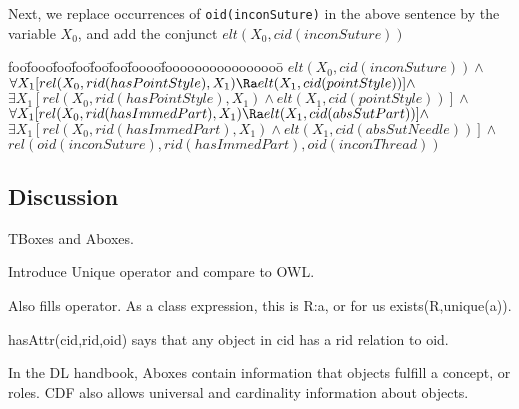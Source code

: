 \noindent
Next, we replace occurrences of {\tt oid(inconSuture)} in the above
sentence by the variable $X_0$, and add the conjunct
$elt(X_0,cid(inconSuture))$ 
{\small
\begin{tabbing}
foo\=fooo\=foo\=foo\=foo\=foo\=foooo\=foooooooooooooooo\=\kill
\> $elt(X_0,cid(inconSuture)) \wedge$ \\
\> $\forall X_1 [rel(X_0,rid(hasPointStyle),X_1) 
	\Ra elt(X_1,cid(pointStyle))] \wedge$ \\
\> $\exists X_1 [rel(X_0,rid(hasPointStyle),X_1) 
	\wedge elt(X_1,cid(pointStyle))] \wedge$ \\
\> $\forall X_1 [rel(X_0,rid(hasImmedPart),X_1) 
	\Ra elt(X_1,cid(absSutPart))] \wedge$ \\
\> $\exists X_1 [rel(X_0,rid(hasImmedPart),X_1) 
	\wedge elt(X_1,cid(absSutNeedle))] \wedge$ \\
\> $rel(oid(inconSuture),rid(hasImmedPart),oid(inconThread))$ 
\end{tabbing}
}



\subsection{Discussion}

TBoxes and Aboxes.

Introduce Unique operator and compare to OWL.

Also fills operator.  As a class expression, this is R:a, or for us
exists(R,unique(a)).

hasAttr(cid,rid,oid) says that any object in cid has a rid relation to oid.

In the DL handbook, Aboxes contain information that objects fulfill a
concept, or roles.  CDF also allows universal and cardinality
information about objects.


